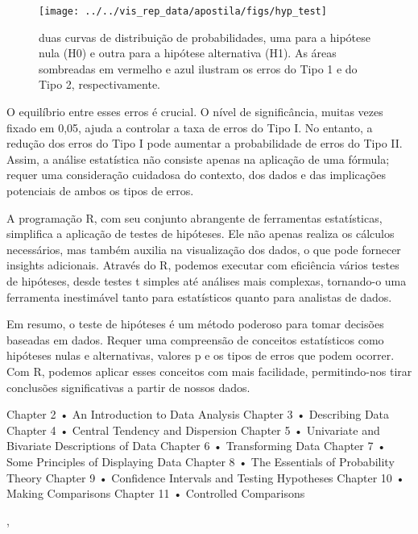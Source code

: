 \documentclass[article]{memoir}
\begin{document}
\begin{figure}[ht]
	\centering
	\texttt{[image: ../../vis\_rep\_data/apostila/figs/hyp\_test]}
	\caption{duas curvas de distribuição de probabilidades, uma para a hipótese nula (H0) e outra para a hipótese alternativa (H1). As áreas sombreadas em vermelho e azul ilustram os erros do Tipo 1 e do Tipo 2, respectivamente.}
	\label{fig:hyptest}
\end{figure}


O equilíbrio entre esses erros é crucial. O nível de significância, muitas vezes fixado em 0,05, ajuda a controlar a taxa de erros do Tipo I. No entanto, a redução dos erros do Tipo I pode aumentar a probabilidade de erros do Tipo II. Assim, a análise estatística não consiste apenas na aplicação de uma fórmula; requer uma consideração cuidadosa do contexto, dos dados e das implicações potenciais de ambos os tipos de erros.

A programação R, com seu conjunto abrangente de ferramentas estatísticas, simplifica a aplicação de testes de hipóteses. Ele não apenas realiza os cálculos necessários, mas também auxilia na visualização dos dados, o que pode fornecer insights adicionais. Através do R, podemos executar com eficiência vários testes de hipóteses, desde testes t simples até análises mais complexas, tornando-o uma ferramenta inestimável tanto para estatísticos quanto para analistas de dados.

Em resumo, o teste de hipóteses é um método poderoso para tomar decisões baseadas em dados. Requer uma compreensão de conceitos estatísticos como hipóteses nulas e alternativas, valores p e os tipos de erros que podem ocorrer. Com R, podemos aplicar esses conceitos com mais facilidade, permitindo-nos tirar conclusões significativas a partir de nossos dados.




Chapter 2 • An Introduction to Data Analysis
Chapter 3 • Describing Data
Chapter 4 • Central Tendency and Dispersion
Chapter 5 • Univariate and Bivariate Descriptions of Data
Chapter 6 • Transforming Data
Chapter 7 • Some Principles of Displaying Data
Chapter 8 • The Essentials of Probability Theory
Chapter 9 • Confidence Intervals and Testing Hypotheses
Chapter 10 • Making Comparisons
Chapter 11 • Controlled Comparisons

\newpage, 
\thispagestyle{plain}
\printpagenotes


\thispagestyle{plain}
\end{document}
